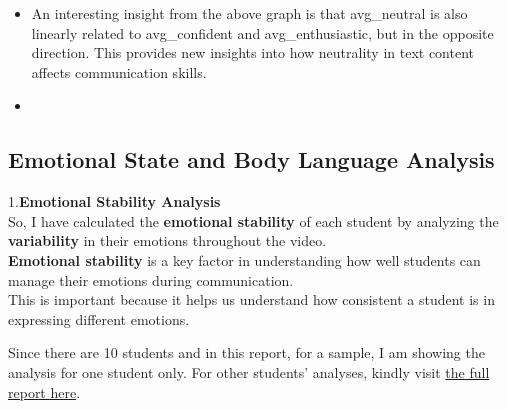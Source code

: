 \documentclass{article}
\begin{document}
\begin{itemize}
\begin{center}
      \caption{Correlation Diagram for Text Scores with Confidence and Enthusiasm}
      \label{fig:correlation-diagram}
  \end{center}
      
    \item An interesting insight from the above graph is that avg\_neutral is also linearly related to avg\_confident and avg\_enthusiastic, but in the opposite direction. This provides new insights into how neutrality in text content affects communication skills.
    
    \item 
    \vspace{0.1in}
\end{itemize}


\subsection{Emotional State and Body Language Analysis}

1.\textbf{Emotional Stability Analysis} \\
So, I have calculated the \textbf{emotional stability} of each student by analyzing the \textbf{variability} in their emotions throughout the video.\\  

\textbf{Emotional stability} is a key factor in understanding how well students can manage their emotions during communication.\\
This is important because it helps us understand how consistent a student is in expressing different emotions.\\

\begin{tcolorbox}[colback=yellow!10!white, colframe=red!80!black, title=Warning]
Since there are 10 students and in this report, for a sample, I am showing the analysis for one student only. For other students' analyses, kindly visit \href{https://eda-analysis-iby-0.streamlit.app/}{the full report here}.
\end{tcolorbox}
\end{document}
